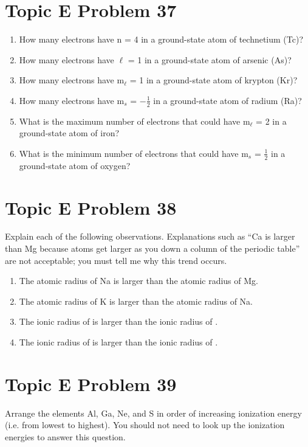 \documentclass[10pt]{article}
\begin{document}
    \pagebreak
    \section{Topic E Problem 37}
        \begin{enumerate}[label=\alph*)]
            \item   How many electrons have n = 4 in a ground-state atom of technetium (Tc)?
            \item   How many electrons have $\ell$ = 1 in a ground-state atom of arsenic (As)?
            \item   How many electrons have m$_\ell$ = 1 in a ground-state atom of krypton (Kr)?
            \item   How many electrons have m$_s$ = $-\frac{1}{2}$ in a ground-state atom of radium (Ra)?
            \item   What is the maximum number of electrons that could have m$_\ell$ = 2 in a ground-state atom of iron?
            \item   What is the minimum number of electrons that could have m$_s$ = $\frac{1}{2}$ in a ground-state atom of oxygen?
        \end{enumerate}


    \pagebreak
    \section{Topic E Problem 38}
        Explain each of the following observations. 
        Explanations such as “Ca is larger than Mg because atoms get larger as you down a column of the periodic table” are not acceptable; you must tell me why this trend occurs.
        \begin{enumerate}[label=\alph*)]
            \item   The atomic radius of Na is larger than the atomic radius of Mg.
            \item   The atomic radius of K is larger than the atomic radius of Na.
            \item   The ionic radius of  is larger than the ionic radius of .
            \item   The ionic radius of  is larger than the ionic radius of .
        \end{enumerate}
        

    \pagebreak
    \section{Topic E Problem 39}
        Arrange the elements Al, Ga, Ne, and S in order of increasing ionization energy (i.e. from lowest to highest). 
        You should not need to look up the ionization energies to answer this question.
\end{document}
